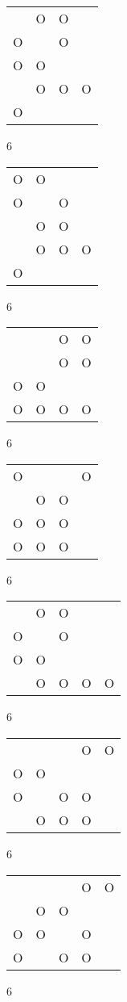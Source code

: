 \begin{tabular}{|m{0.2cm}m{0.2cm}m{0.2cm}m{0.2cm}|}\hline
 &O&O& \\
O& &O& \\
O&O& & \\
 &O&O&O\\
O& & & \\
\hline\end{tabular}6
\begin{tabular}{|m{0.2cm}m{0.2cm}m{0.2cm}m{0.2cm}|}\hline
O&O& & \\
O& &O& \\
 &O&O& \\
 &O&O&O\\
O& & & \\
\hline\end{tabular}6
\begin{tabular}{|m{0.2cm}m{0.2cm}m{0.2cm}m{0.2cm}|}\hline
 & &O&O\\
 & &O&O\\
O&O& & \\
O&O&O&O\\
\hline\end{tabular}6
\begin{tabular}{|m{0.2cm}m{0.2cm}m{0.2cm}m{0.2cm}|}\hline
O& & &O\\
 &O&O& \\
O&O&O& \\
O&O&O& \\
\hline\end{tabular}6
\begin{tabular}{|m{0.2cm}m{0.2cm}m{0.2cm}m{0.2cm}m{0.2cm}|}\hline
 &O&O& & \\
O& &O& & \\
O&O& & & \\
 &O&O&O&O\\
\hline\end{tabular}6
\begin{tabular}{|m{0.2cm}m{0.2cm}m{0.2cm}m{0.2cm}m{0.2cm}|}\hline
 & & &O&O\\
O&O& & & \\
O& &O&O& \\
 &O&O&O& \\
\hline\end{tabular}6
\begin{tabular}{|m{0.2cm}m{0.2cm}m{0.2cm}m{0.2cm}m{0.2cm}|}\hline
 & & &O&O\\
 &O&O& & \\
O&O& &O& \\
O& &O&O& \\
\hline\end{tabular}6
